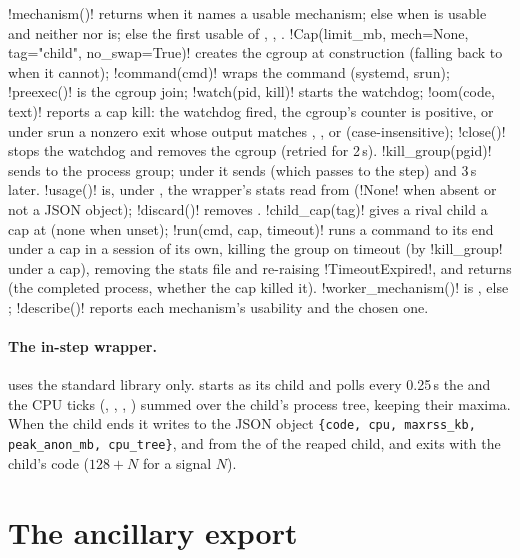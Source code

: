 \py!mechanism()! returns  when it names a usable mechanism; else
 when  is usable and neither  nor  is; else
the first usable of , , . \py!Cap(limit_mb, mech=None, tag="child", no_swap=True)! creates the cgroup at construction (falling back to 
when it cannot); \py!command(cmd)! wraps the command (systemd, srun); \py!preexec()! is the
cgroup join; \py!watch(pid, kill)! starts the watchdog; \py!oom(code, text)! reports a cap kill:
the watchdog fired, the cgroup's  counter is positive, or under srun a nonzero
exit whose output matches , , or
 (case-insensitive); \py!close()! stops the watchdog and removes the cgroup
(retried for 2\,s). \py!kill_group(pgid)! sends  to the process group; under
 it sends  (which  passes to the step) and 
3\,s later. \py!usage()! is, under , the wrapper's stats read from 
(\py!None! when absent or not a JSON object); \py!discard()! removes .
\py!child_cap(tag)! gives a rival child a cap at 
(none when unset); \py!run(cmd, cap, timeout)! runs a command to its end under a cap in a
session of its own, killing the group on timeout (by \py!kill_group! under a cap), removing
the stats file and re-raising \py!TimeoutExpired!, and returns (the completed process, whether the cap killed it).
\py!worker_mechanism()! is , else ;
\py!describe()! reports each mechanism's usability and the chosen one.

\paragraph{The in-step wrapper.}  uses the standard library only.
 starts  as its child and polls every
0.25\,s the  and the CPU ticks (, , ,
) summed over the child's process tree, keeping their maxima. When the child ends it
writes to  the JSON object \texttt{\{code, cpu, maxrss\_kb, peak\_anon\_mb,
cpu\_tree\}},  and  from the  of the reaped
child, and exits with the child's code ($128+N$ for a signal $N$).

\section{The ancillary export}\label{sec:bench-anc}


